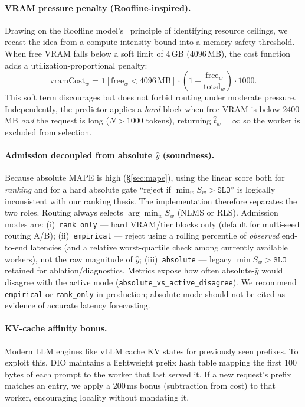\documentclass[10pt,twocolumn,letterpaper]{article}
\begin{document}
\paragraph{VRAM pressure penalty (Roofline-inspired).}
Drawing on the Roofline model's~\cite{williams2009roofline} principle of identifying resource ceilings, we recast the idea from a compute-intensity bound into a memory-safety threshold. When free VRAM falls below a soft limit of $4$\,GB ($4096$\,MB), the cost function adds a utilization-proportional penalty:
\begin{equation}
\text{vramCost}_w = \mathbf{1}[\text{free}_w < 4096\,\text{MB}] \cdot \left(1 - \frac{\text{free}_w}{\text{total}_w}\right) \cdot 1000.
\end{equation}
This soft term discourages but does not forbid routing under moderate pressure. Independently, the predictor applies a \emph{hard} block when free VRAM is below $2400$\,MB \emph{and} the request is long ($N > 1000$ tokens), returning $\hat{t}_w = \infty$ so the worker is excluded from selection.

\paragraph{Admission decoupled from absolute $\hat{y}$ (soundness).}
\label{sec:admission_decouple}
Because absolute MAPE is high (\S\ref{sec:mape}), using the linear score both for \emph{ranking} and for a hard absolute gate ``reject if $\min_w S_w > \texttt{SLO}$'' is logically inconsistent with our ranking thesis. The implementation therefore separates the two roles. Routing always selects $\arg\min_w S_w$ (NLMS or RLS). Admission modes are:
(i)~\texttt{rank\_only} --- hard VRAM/tier blocks only (default for multi-seed routing A/B);
(ii)~\texttt{empirical} --- reject using a rolling percentile of \emph{observed} end-to-end latencies (and a relative worst-quartile check among currently available workers), not the raw magnitude of $\hat{y}$;
(iii)~\texttt{absolute} --- legacy $\min S_w > \texttt{SLO}$ retained for ablation/diagnostics.
Metrics expose how often absolute-$\hat{y}$ would disagree with the active mode (\texttt{absolute\_vs\_active\_disagree}). We recommend \texttt{empirical} or \texttt{rank\_only} in production; absolute mode should not be cited as evidence of accurate latency forecasting.

\paragraph{KV-cache affinity bonus.}
Modern LLM engines like vLLM cache KV states for previously seen prefixes. To exploit this, DIO maintains a lightweight prefix hash table mapping the first 100 bytes of each prompt to the worker that last served it. If a new request's prefix matches an entry, we apply a 200\,ms bonus (subtraction from cost) to that worker, encouraging locality without mandating it.
\end{document}
